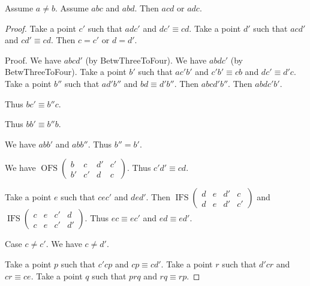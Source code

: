 \documentclass[10pt,a4paper,parskip=half,numbers=endperiod,headings=standardclasses,parskip]{scrartcl}
\newcommand{\Cong}[4]{#1 #2 \equiv #3 #4}
\newcommand{\Betw}[3]{#1 #2 #3}
\newcommand{\BetwFour}[4]{#1 #2 #3 #4}
\newcommand{\BetwFive}[5]{#1 #2 #3 #4 #5}
\newcommand{\bprime}{b'}
\newcommand{\cprime}{c'}
\def\dprime{d'}
\newcommand{\bdoubleprime}{b''}
\newcommand{\OFS}[8]{\operatorname{OFS}%
\left(
\begin{smallmatrix}%
#1 & #2 & #3 & #4 \\
#5 & #6 & #7 & #8
\end{smallmatrix}%
\right)%
}
\newcommand{\IFS}[8]{\operatorname{IFS}
\left(
\begin{smallmatrix}%
#1 & #2 & #3 & #4 \\
#5 & #6 & #7 & #8
\end{smallmatrix}
\right)%
}
\begin{document}
  \begin{forthel}
    \begin{lemma}[Gupta] %
      Assume $a \neq b$.
      Assume $\Betw{a}{b}{c}$ and $\Betw{a}{b}{d}$.
      Then $\Betw{a}{c}{d}$ or $\Betw{a}{d}{c}$.
    \end{lemma}

    \begin{proof}
      Take a point $\cprime$ such that
        $\Betw{a}{d}{\cprime}$ and $\Cong{d}{\cprime}{c}{d}$.
      Take a point $\dprime$ such that
        $\Betw{a}{c}{\dprime}$ and $\Cong{c}{\dprime}{c}{d}$.
      Then $c = \cprime$ or $d = \dprime$.

      Proof.
        We have $\BetwFour{a}{b}{c}{\dprime}$ (by BetwThreeToFour).
        We have $\BetwFour{a}{b}{d}{\cprime}$ (by BetwThreeToFour).
        Take a point $\bprime$ such that
          $\Betw{a}{\cprime}{\bprime}$ and
          $\Cong{\cprime}{\bprime}{c}{b}$ and
          $\Cong{d}{\cprime}{\dprime}{c}$.
        Take a point $\bdoubleprime$ such that
          $\Betw{a}{\dprime}{\bdoubleprime}$ and
          $\Cong{b}{d}{\dprime}{\bdoubleprime}$.
        Then $\BetwFive{a}{b}{c}{\dprime}{\bdoubleprime}$.
        Then $\BetwFive{a}{b}{d}{\cprime}{\bprime}$.

        Thus $\Cong{b}{\cprime}{\bdoubleprime}{c}$.

        Thus $\Cong{b}{\bprime}{\bdoubleprime}{b}$.

        We have $\Betw{a}{b}{\bprime}$ and $\Betw{a}{b}{\bdoubleprime}$.
        Thus $\bdoubleprime = \bprime$. %

        We have $\OFS{b}{c}{\dprime}{\cprime}{\bprime}{\cprime}{d}{c}$.
        Thus $\Cong{\cprime}{\dprime}{c}{d}$.

        Take a point $e$ such that
          $\Betw{c}{e}{\cprime}$ and $\Betw{d}{e}{\dprime}$.
        Then $\IFS{d}{e}{\dprime}{c}{d}{e}{\dprime}{\cprime}$
        and $\IFS{c}{e}{\cprime}{d}{c}{e}{\cprime}{\dprime}$.
        Thus $\Cong{e}{c}{e}{\cprime}$ and $\Cong{e}{d}{e}{\dprime}$.

        Case $c \neq \cprime$.
          We have $c\neq \dprime$.

          Take a point $p$ such that
            $\Betw{\cprime}{c}{p}$ and $\Cong{c}{p}{c}{\dprime}$.
          Take a point $r$ such that
            $\Betw{\dprime}{c}{r}$ and $\Cong{c}{r}{c}{e}$.
          Take a point $q$ such that
            $\Betw{p}{r}{q}$ and $\Cong{r}{q}{r}{p}$.


\end{proof}
\end{forthel}
\end{document}
